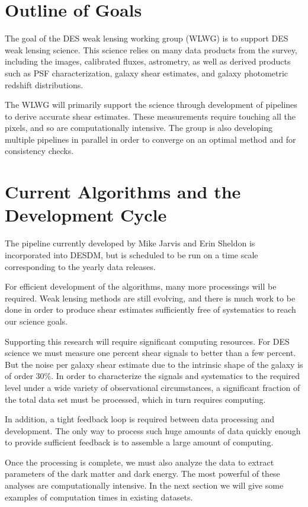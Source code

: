 \documentclass[12pt]{article}
\begin{document}
\section{Outline of Goals}

The goal of the DES weak lensing working group (WLWG) is to support DES weak
lensing science.  This science relies on many data products from the survey,
including the images, calibrated fluxes, astrometry, as well as derived
products such as PSF characterization, galaxy shear estimates, and galaxy
photometric redshift distributions.

The WLWG will primarily support the science through development of pipelines to
derive accurate shear estimates.  These measurements require touching all the
pixels, and so are computationally intensive.  The group is also developing
multiple pipelines in parallel in order to converge on an optimal method and
for consistency checks.  


\section{Current Algorithms and the Development Cycle}

The pipeline currently developed by Mike Jarvis and Erin Sheldon is
incorporated into DESDM, but is scheduled to be run on a time scale
corresponding to the yearly data releases. 

For efficient development of the algorithms, many more processings will be
required.  Weak lensing methods are still evolving, and there is much
work to be done in order to produce shear estimates sufficiently free of
systematics to reach our science goals.

Supporting this research will require significant computing resources. For DES
science we must measure one percent shear signals to better than a few percent.
But the noise per galaxy shear estimate due to the intrinsic shape of the
galaxy is of order 30\%.  In order to characterize the signals and systematics
to the required level under a wide variety of observational circumstances, a
significant fraction of the total data set must be processed, which in turn
requires computing.

In addition, a tight feedback loop is required between data processing and
development.  The only way to process such huge amounts of data quickly enough
to provide sufficient feedback is to assemble a large amount of computing.

Once the processing is complete, we must also analyze the data to extract
parameters of the dark matter and dark energy.   The most powerful of these
analyses are computationally intensive.  In the next section we will give
some examples of computation times in existing datasets.
\end{document}
